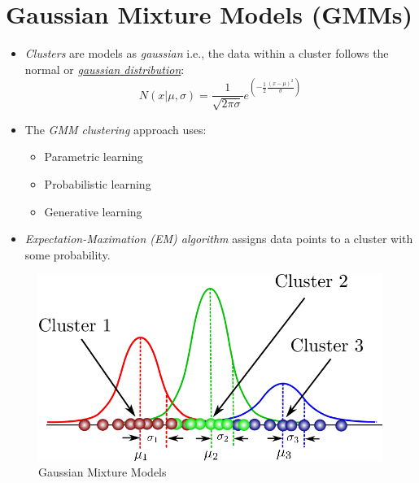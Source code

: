 \documentclass[
	number={6},
	title={Clustering}
]{cs584notes}
\begin{document}
\section{Gaussian Mixture Models (GMMs)}\label{sec:gaussian-mixture-models-(gmm)s}
\begin{itemize}
	\item \emph{Clusters} are models as \emph{gaussian} i.e., the data within a cluster follows the normal or \emph{\hyperref[eq:gaussian-distribution]{gaussian distribution}}:
	\begin{equation}
		N(x | \mu, \sigma) = \frac{1}{\sqrt{2\pi\sigma}}e^{\left( -\frac{1}{2}\frac{(x-\mu)^{2}}{\sigma} \right)}
		\label{eq:gaussian-distribution-2}
	\end{equation}
	\item The \emph{GMM clustering} approach uses:
	\begin{itemize}
		\item Parametric learning
		\item Probabilistic learning
		\item Generative learning
	\end{itemize}
	\item \emph{Expectation-Maximation (EM) algorithm} assigns data points to a cluster with some probability.
\end{itemize}

\begin{figure}[H]
	\centering
	\includegraphics[width=\textwidth]{figures/6/gmm_clusters}
	\caption{Gaussian Mixture Models}
	\label{fig:gmm-clusters}
\end{figure}
\end{document}
